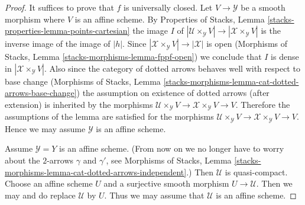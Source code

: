 \documentclass[10pt,a4paper]{amsart}
\theoremstyle{plain}
\theoremstyle{definition}
\theoremstyle{remark}
\numberwithin{equation}{subsection}
\begin{document}
\begin{proof}
It suffices to prove that $f$ is universally closed.
Let $V \to \mathcal{Y}$ be a smooth morphism where $V$ is an affine scheme.
By Properties of Stacks, Lemma
\ref{stacks-properties-lemma-points-cartesian}
the image $I$ of
$|\mathcal{U} \times_\mathcal{Y} V| \to |\mathcal{X} \times_\mathcal{Y} V|$
is the inverse image of the image of $|h|$. Since
$|\mathcal{X} \times_\mathcal{Y} V| \to |\mathcal{X}|$ is open
(Morphisms of Stacks, Lemma \ref{stacks-morphisms-lemma-fppf-open})
we conclude that $I$ is dense in $|\mathcal{X} \times_\mathcal{Y} V|$.
Also since the category of dotted arrows behaves well with respect
to base change (Morphisms of Stacks, Lemma
\ref{stacks-morphisms-lemma-cat-dotted-arrows-base-change})
the assumption on existence of dotted arrows (after extension)
is inherited by the morphisms
$\mathcal{U} \times_\mathcal{Y} V \to \mathcal{X} \times_\mathcal{Y} V \to V$.
Therefore the assumptions of the lemma are
satisfied for the morphisms
$\mathcal{U} \times_\mathcal{Y} V \to \mathcal{X} \times_\mathcal{Y} V \to V$.
Hence we may assume $\mathcal{Y}$ is an affine scheme.

\medskip\noindent
Assume $\mathcal{Y} = Y$ is an affine scheme.
(From now on we no longer have to worry about the
$2$-arrows $\gamma$ and $\gamma'$, see Morphisms of Stacks, Lemma
\ref{stacks-morphisms-lemma-cat-dotted-arrows-independent}.)
Then $\mathcal{U}$ is quasi-compact. Choose an affine scheme $U$ and a
surjective smooth morphism $U \to \mathcal{U}$.
Then we may and do replace $\mathcal{U}$ by $U$.
Thus we may assume that $\mathcal{U}$ is an affine scheme.


\end{proof}
\end{document}
